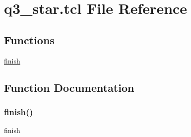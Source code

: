 \hypertarget{q3__star_8tcl}{}\section{q3\+\_\+star.\+tcl File Reference}
\label{q3__star_8tcl}
\subsection*{Functions}
\begin{DoxyCompactItemize}
\item 
\hyperlink{q3__star_8tcl_a30728837c246b65ef76298af0101d99c}{finish}
\end{DoxyCompactItemize}


\subsection{Function Documentation}
\mbox{\label{q3__star_8tcl_a30728837c246b65ef76298af0101d99c}} 
\subsubsection{\texorpdfstring{finish()}{finish()}}
{\footnotesize\ttfamily finish}

